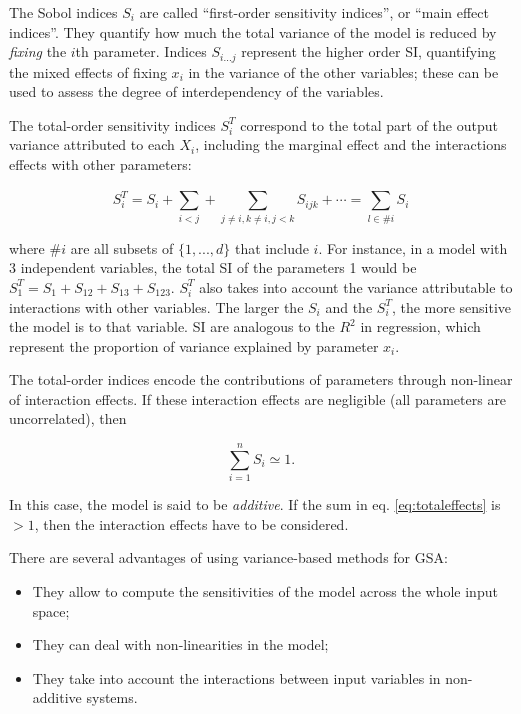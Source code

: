 \documentclass[12pt]{article}
\begin{document}
{\vspace{0.5cm}
The Sobol indices $S_{i}$  are called ``first-order sensitivity indices'', or ``main effect indices''. They quantify how much the total variance of the model is reduced by \textit{fixing} the $i$th parameter. Indices $S_{i...j}$ represent the higher order SI, quantifying the mixed effects of fixing $x_{i}$ in the variance of the other variables; these can be used to assess the degree of interdependency of the variables.

The total-order sensitivity indices $S^{T}_{i}$ correspond to the total part of the output variance attributed to each $X_{i}$, including the marginal effect and the interactions effects with other parameters: 

\begin{equation}
S^{T}_{i}=S_{i}+\sum^{}_{i<j}+\sum_{j\neq i,k\neq i,j<k}S_{ijk}+\cdots =\sum_{l\in {\#}i}S_{i}
\end{equation}

\vspace{0.5cm} 
where $\#i$ are all subsets of $\{1,...,d\}$ that include $i$. For instance, in a model with 3 independent variables, the total SI of the parameters 1 would be $S^{T}_{1}=S_{1}+S_{12}+S_{13}+S_{123}$.  $S^{T}_{i}$ also takes into account the variance attributable to interactions with other variables.  The larger the $S_{i}$ and the $S^{T}_{i}$, the more sensitive the model is to that variable. SI are analogous to the $R^{2}$ in regression, which represent the proportion of variance explained by parameter $x_{i}$. 

The total-order indices encode the contributions of parameters through non-linear of interaction effects. If these interaction effects are negligible (all parameters are uncorrelated), then

\begin{equation} \label{eq:totaleffects}
	\sum^{n}_{i=1}S_{i} \simeq 1.
\end{equation}

In this case, the model is said to be \textit{additive}. If the sum in eq. \ref{eq:totaleffects} is $>1$, then the interaction effects have to be considered. 

There are several advantages of using variance-based methods for GSA:
\begin{itemize}
	\item They allow to compute the sensitivities of the model across the whole input space;
	\item They can deal with non-linearities in the model; 
	\item They take into account the interactions between input variables in non-additive systems.
\end{itemize}



}
\end{document}
